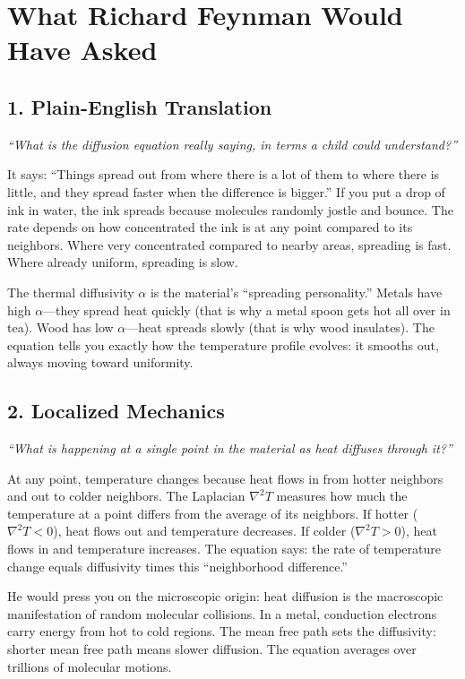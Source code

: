 \documentclass[11pt,openright]{book}
\begin{document}
\section*{What Richard Feynman Would Have Asked}

\subsection*{1. Plain-English Translation}
\textit{``What is the diffusion equation really saying, in terms a child could understand?''}

It says: ``Things spread out from where there is a lot of them to where there is little, and they spread faster when the difference is bigger.'' If you put a drop of ink in water, the ink spreads because molecules randomly jostle and bounce. The rate depends on how concentrated the ink is at any point compared to its neighbors. Where very concentrated compared to nearby areas, spreading is fast. Where already uniform, spreading is slow.

The thermal diffusivity $\alpha$ is the material's ``spreading personality.'' Metals have high $\alpha$---they spread heat quickly (that is why a metal spoon gets hot all over in tea). Wood has low $\alpha$---heat spreads slowly (that is why wood insulates). The equation tells you exactly how the temperature profile evolves: it smooths out, always moving toward uniformity.

\subsection*{2. Localized Mechanics}
\textit{``What is happening at a single point in the material as heat diffuses through it?''}

At any point, temperature changes because heat flows in from hotter neighbors and out to colder neighbors. The Laplacian $\nabla^2 T$ measures how much the temperature at a point differs from the average of its neighbors. If hotter ($\nabla^2 T < 0$), heat flows out and temperature decreases. If colder ($\nabla^2 T > 0$), heat flows in and temperature increases. The equation says: the rate of temperature change equals diffusivity times this ``neighborhood difference.''

He would press you on the microscopic origin: heat diffusion is the macroscopic manifestation of random molecular collisions. In a metal, conduction electrons carry energy from hot to cold regions. The mean free path sets the diffusivity: shorter mean free path means slower diffusion. The equation averages over trillions of molecular motions.
\end{document}
